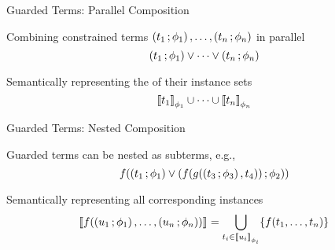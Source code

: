 \documentclass[11pt]{beamer}
\begin{document}
\begin{frame}{Guarded Terms: Parallel Composition}
\begin{outeritemize}
    \item Combining constrained terms $\left( t_1 \,; \phi_1 \right),\ldots,\left( t_n \,; \phi_n \right)$ in \alert{parallel}
    \[\left( t_1 \,; \phi_1 \right) \lor \cdots \lor \left( t_n \,; \phi_n \right)\]
    
    \item Semantically representing the  of their instance sets
    \[\left\llbracket t_1 \right\rrbracket_{\phi_1} \cup \cdots \cup \left\llbracket t_n \right\rrbracket_{\phi_n}\]
\end{outeritemize}

\end{frame}



\begin{frame}{Guarded Terms: Nested Composition}
\begin{outeritemize}
    \item Guarded terms can be \alert{nested} as subterms, e.g., 
    \[f(\left( t_1 \,; \phi_1 \right) \lor \left( f(g(\left( t_3 \,; \phi_3 \right),t_4)) \,; \phi_2 \right))\]
    
    \item Semantically representing all corresponding instances
    \[\left\llbracket f(\left( u_1 \,; \phi_1 \right),\ldots,\left( u_n \,; \phi_n \right)) \right\rrbracket_{} = \bigcup_{t_i \in \left\llbracket u_i \right\rrbracket_{\phi_i}}\{f(t_1,\ldots,t_n)\} \]
    
\end{outeritemize}
\end{frame}
\end{document}
